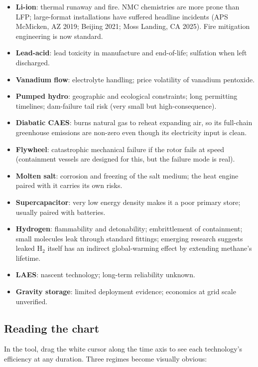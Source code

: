 \begin{itemize}
    \item \textbf{Li-ion}: thermal runaway and fire. NMC chemistries
    are more prone than LFP; large-format installations have suffered
    headline incidents (APS McMicken, AZ 2019; Beijing 2021;
    Moss Landing, CA 2025). Fire mitigation engineering is now
    standard.
    \item \textbf{Lead-acid}: lead toxicity in manufacture and
    end-of-life; sulfation when left discharged.
    \item \textbf{Vanadium flow}: electrolyte handling; price
    volatility of vanadium pentoxide.
    \item \textbf{Pumped hydro}: geographic and ecological
    constraints; long permitting timelines; dam-failure tail risk
    (very small but high-consequence).
    \item \textbf{Diabatic CAES}: burns natural gas to reheat
    expanding air, so its full-chain greenhouse emissions are non-zero
    even though its electricity input is clean.
    \item \textbf{Flywheel}: catastrophic mechanical failure if the
    rotor fails at speed (containment vessels are designed for this,
    but the failure mode is real).
    \item \textbf{Molten salt}: corrosion and freezing of the salt
    medium; the heat engine paired with it carries its own risks.
    \item \textbf{Supercapacitor}: very low energy density makes it
    a poor primary store; usually paired with batteries.
    \item \textbf{Hydrogen}: flammability and detonability;
    embrittlement of containment; small molecules leak through
    standard fittings; emerging research suggests leaked H$_2$ itself
    has an indirect global-warming effect by extending methane's
    lifetime.
    \item \textbf{LAES}: nascent technology; long-term reliability
    unknown.
    \item \textbf{Gravity storage}: limited deployment evidence;
    economics at grid scale unverified.
\end{itemize}

\subsection*{Reading the chart}

In the tool, drag the white cursor along the time axis to see each
technology's efficiency at any duration. Three regimes become
visually obvious:

